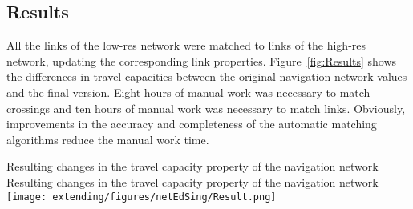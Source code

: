 \subsection{Results}
All the links of the low-res network were matched to links of the high-res network, updating the corresponding link properties. Figure~\ref{fig:Results} shows the differences in travel capacities between the original navigation network values and the final version. Eight hours of manual work was necessary to match crossings and ten hours of manual work was necessary to match links. Obviously, improvements in the accuracy and completeness of the automatic matching algorithms reduce the manual work time.

\createfigure
{Resulting changes in the travel capacity property of the navigation network}
{Resulting changes in the travel capacity property of the navigation network}
{\label{fig:Results}}
{\texttt{[image: extending/figures/netEdSing/Result.png]}}
{}

